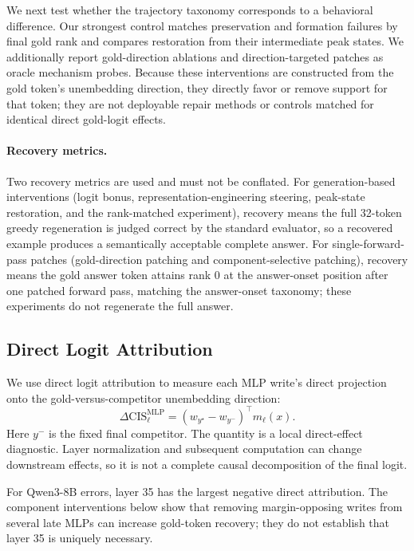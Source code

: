 \documentclass{article} %
\begin{document}
We next test whether the trajectory taxonomy corresponds to a behavioral difference. Our strongest control matches preservation and formation failures by final gold rank and compares restoration from their intermediate peak states. We additionally report gold-direction ablations and direction-targeted patches as oracle mechanism probes. Because these interventions are constructed from the gold token's unembedding direction, they directly favor or remove support for that token; they are not deployable repair methods or controls matched for identical direct gold-logit effects.

\paragraph{Recovery metrics.}
Two recovery metrics are used and must not be conflated. For generation-based interventions (logit bonus, representation-engineering steering, peak-state restoration, and the rank-matched experiment), recovery means the full 32-token greedy regeneration is judged correct by the standard evaluator, so a recovered example produces a semantically acceptable complete answer. For single-forward-pass patches (gold-direction patching and component-selective patching), recovery means the gold answer token attains rank 0 at the answer-onset position after one patched forward pass, matching the answer-onset taxonomy; these experiments do not regenerate the full answer.

\subsection{Direct Logit Attribution}

We use direct logit attribution \citep{elhage2021mathematical, geva2021transformer} to measure each MLP write's direct projection onto the gold-versus-competitor unembedding direction:
\begin{equation}
\Delta \mathrm{CIS}^{\mathrm{MLP}}_\ell = (w_{y^\star} - w_{y^-})^\top m_\ell(x) .
\end{equation}
Here $y^-$ is the fixed final competitor. The quantity is a local direct-effect diagnostic. Layer normalization and subsequent computation can change downstream effects, so it is not a complete causal decomposition of the final logit.

For Qwen3-8B errors, layer 35 has the largest negative direct attribution. The component interventions below show that removing margin-opposing writes from several late MLPs can increase gold-token recovery; they do not establish that layer 35 is uniquely necessary.
\end{document}
